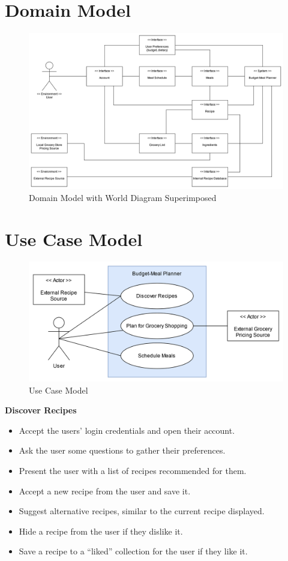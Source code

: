 \documentclass[11pt, letterpaper]{report}
\begin{document}
\chapter{Domain Model}
\begin{figure}[h]
    \centering
    \includegraphics[width=\textwidth]{images/Domain_Model.png}
    \caption{Domain Model with World Diagram Superimposed}
\end{figure}

\chapter{Use Case Model}
\begin{figure}[h]
    \centering
    \includegraphics[width=\textwidth]{images/Use_Case.png}
    \caption{Use Case Model}
\end{figure}

\noindent \textbf{Discover Recipes}
\begin{itemize}
    \item Accept the users’ login credentials and open their account.
    \item Ask the user some questions to gather their preferences.
    \item Present the user with a list of recipes recommended for them.
    \item Accept a new recipe from the user and save it.
    \item Suggest alternative recipes, similar to the current recipe displayed.
    \item Hide a recipe from the user if they dislike it.
    \item Save a recipe to a “liked” collection for the user if they like it.
\end{itemize}
\end{document}
